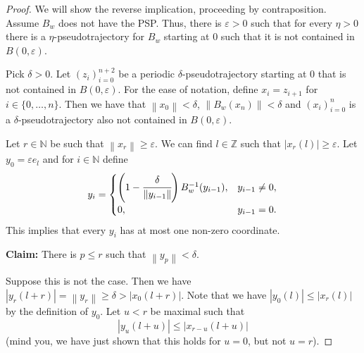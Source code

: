 \documentclass[10pt,a4paper]{amsart}
\newcommand{\N}{\mathbb{N}}
\newcommand{\Z}{\mathbb{Z}}
\newcommand{\abs}[1]{\left| #1 \right|}
\newcommand{\eps}{\varepsilon}
\newcommand{\norm}[1]{\left\| #1 \right\|}
\begin{document}
	\begin{proof}
		We will show the reverse implication, proceeding by contraposition. Assume \(B_w\) does not have the PSP. Thus, there is \(\varepsilon > 0\) such that for every \(\eta > 0\) there is a \(\eta\)-pseudotrajectory for \(B_w\) starting at \(0\) such that it is not contained in \(B(0,\varepsilon)\).
		
		Pick \(\delta > 0\). Let \((z_i)_{i=0}^{n+2}\) be a periodic \(\delta\)-pseudotrajectory starting at \(0\) that is not contained in \(B(0,\varepsilon)\). For the ease of notation, define \(x_i = z_{i+1}\) for \(i \in \{0, \dots,n\}\). Then we have that \(\norm{x_0} < \delta \), \(\norm{B_w(x_{n})} < \delta \) and \((x_i)_{i=0}^{n}\) is a \(\delta\)-pseudotrajectory also not contained in \(B(0, \varepsilon)\). 
		
		Let \(r \in \N\) be such that \(\norm{x_r} \geq \varepsilon\). We can find \(l \in \Z\) such that \(\abs{x_r(l)} \geq \varepsilon\). Let \(y_0 = \eps e_l \) and for \(i \in \N\) define
		\begin{equation} \label{eqn:renormedErrorDef}
			y_{i}= \begin{cases}
				\left(1-\cfrac{\delta}{\norm{y_{i-1}}}\right)B_w^{-1}(y_{i-1}), & y_{i-1} \neq 0,\\
				0, & y_{i-1} = 0.
			\end{cases}
		\end{equation}
		This implies that every \(y_i\) has at most one non-zero coordinate.
		
		\textbf{Claim:} There is \(p \leq r\) such that \(\norm{y_p} < \delta\).
		
		Suppose this is not the case. Then we have \(\abs{y_r(l+r)} = \norm{y_r} \geq \delta > \abs{x_{0}(l+r)}\). Note that we have \(\abs{y_0(l)} \leq \abs{x_{r}(l)}\) by the definition of \(y_0\). Let \(u < r\) be maximal such that
		\begin{equation}\label{eqn:maximalu}
			\abs{y_u(l+u)} \leq \abs{x_{r-u}(l+u)}  
		\end{equation}
		(mind you, we have just shown that this holds for $u = 0$, but not $u=r$).
		

\end{proof}
\end{document}
